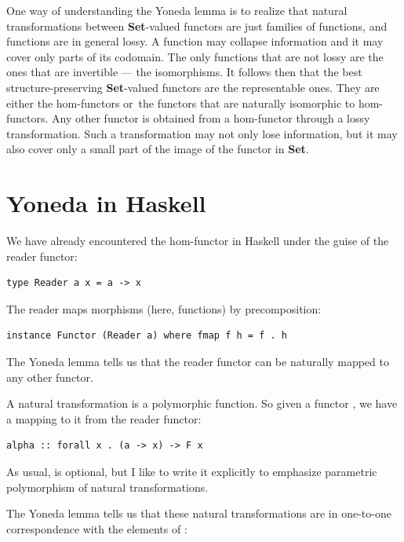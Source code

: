 One way of understanding the Yoneda lemma is to realize that natural
transformations between \textbf{Set}-valued functors are just families
of functions, and functions are in general lossy. A function may
collapse information and it may cover only parts of its codomain. The
only functions that are not lossy are the ones that are invertible ---
the isomorphisms. It follows then that the best structure-preserving
\textbf{Set}-valued functors are the representable ones. They are either
the hom-functors or~the functors that are naturally isomorphic to
hom-functors. Any other functor  is obtained from a
hom-functor through a lossy transformation. Such a transformation may
not only lose information, but it may also cover only a small part of
the image of the functor  in \textbf{Set}.

\section{Yoneda in Haskell}\label{yoneda-in-haskell}

We have already encountered the hom-functor in Haskell under the guise
of the reader functor:

\begin{Verbatim}[commandchars=\\\{\}]
type Reader a x = a -> x
\end{Verbatim}

The reader maps morphisms (here, functions) by precomposition:

\begin{Verbatim}[commandchars=\\\{\}]
instance Functor (Reader a) where fmap f h = f . h
\end{Verbatim}

The Yoneda lemma tells us that the reader functor can be naturally
mapped to any other functor.

A natural transformation is a polymorphic function. So given a functor
, we have a mapping to it from the reader functor:

\begin{Verbatim}[commandchars=\\\{\}]
alpha :: forall x . (a -> x) -> F x
\end{Verbatim}

As usual,  is optional, but I like to write it explicitly
to emphasize parametric polymorphism of natural transformations.

The Yoneda lemma tells us that these natural transformations are in
one-to-one correspondence with the elements of :

